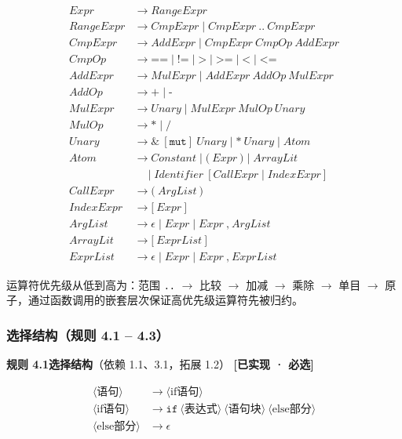 \documentclass[12pt,a4paper]{ctexart}
\begin{document}
\begin{align}
Expr &\rightarrow RangeExpr \\
RangeExpr &\rightarrow CmpExpr \mid CmpExpr \ \texttt{..} \ CmpExpr \\
CmpExpr &\rightarrow AddExpr \mid CmpExpr \ CmpOp \ AddExpr \\
CmpOp &\rightarrow \texttt{==} \mid \texttt{!=} \mid \texttt{>} \mid \texttt{>=} \mid \texttt{<} \mid \texttt{<=} \\
AddExpr &\rightarrow MulExpr \mid AddExpr \ AddOp \ MulExpr \\
AddOp &\rightarrow \texttt{+} \mid \texttt{-} \\
MulExpr &\rightarrow Unary \mid MulExpr \ MulOp \ Unary \\
MulOp &\rightarrow \texttt{*} \mid \texttt{/} \\
Unary &\rightarrow \texttt{\&} \ [\texttt{mut}] \ Unary \mid \texttt{*} \ Unary \mid Atom \\
Atom &\rightarrow Constant \mid \texttt{(} \ Expr \ \texttt{)} \mid ArrayLit \\
     &\quad\mid Identifier \ [CallExpr \mid IndexExpr] \\
CallExpr &\rightarrow \texttt{(} \ ArgList \ \texttt{)} \\
IndexExpr &\rightarrow \texttt{[} \ Expr \ \texttt{]} \\
ArgList &\rightarrow \epsilon \mid Expr \mid Expr \ \texttt{,} \ ArgList \\
ArrayLit &\rightarrow \texttt{[} \ ExprList \ \texttt{]} \\
ExprList &\rightarrow \epsilon \mid Expr \mid Expr \ \texttt{,} \ ExprList
\end{align}

运算符优先级从低到高为：范围 \texttt{..} $\rightarrow$ 比较 $\rightarrow$ 加减 $\rightarrow$ 乘除 $\rightarrow$ 单目 $\rightarrow$ 原子，通过函数调用的嵌套层次保证高优先级运算符先被归约。

\subsubsection{选择结构（规则 4.1 -- 4.3）}

\textbf{规则 4.1\quad 选择结构}（依赖 1.1、3.1，拓展 1.2） \hfill \textcolor{green!60!black}{\textbf{[已实现 · 必选]}}

\begin{align}
\langle\text{语句}\rangle &\rightarrow \langle\text{if语句}\rangle \\
\langle\text{if语句}\rangle &\rightarrow \texttt{if} \ \langle\text{表达式}\rangle \ \langle\text{语句块}\rangle \ \langle\text{else部分}\rangle \\
\langle\text{else部分}\rangle &\rightarrow \epsilon
\end{align}
\end{document}
